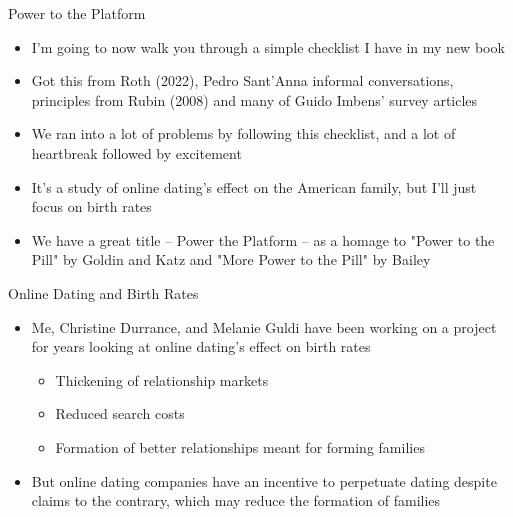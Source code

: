 \documentclass{beamer}
\begin{document}
\begin{frame}{Power to the Platform}

\begin{itemize}
\item I'm going to now walk you through a simple checklist I have in my new book
\item Got this from Roth (2022), Pedro Sant'Anna informal conversations, principles from Rubin (2008) and many of Guido Imbens' survey articles
\item We ran into a lot of problems by following this checklist, and a lot of heartbreak followed by excitement
\item It's a study of online dating's effect on the American family, but I'll just focus on birth rates
\item We have a great title -- Power the Platform -- as a homage to "Power to the Pill" by Goldin and Katz and "More Power to the Pill" by Bailey
\end{itemize}

\end{frame}





\begin{frame}{Online Dating and Birth Rates}

\begin{itemize}
\item Me, Christine Durrance, and Melanie Guldi have been working on a project for years looking at online dating's effect on birth rates
	\begin{itemize}
	\item Thickening of relationship markets
	\item Reduced search costs
	\item Formation of better relationships meant for forming families
	\end{itemize}
\item But online dating companies have an incentive to perpetuate dating despite claims to the contrary, which may reduce the formation of families
\end{itemize}
\end{frame}
\end{document}
